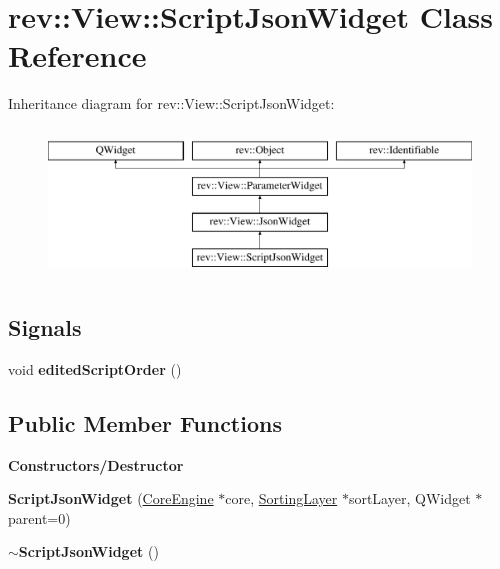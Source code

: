 \hypertarget{classrev_1_1_view_1_1_script_json_widget}{}\section{rev\+::View\+::Script\+Json\+Widget Class Reference}
\label{classrev_1_1_view_1_1_script_json_widget}
Inheritance diagram for rev\+::View\+::Script\+Json\+Widget\+:\begin{figure}[H]
\begin{center}
\leavevmode
\includegraphics[height=4.000000cm]{classrev_1_1_view_1_1_script_json_widget}
\end{center}
\end{figure}
\subsection*{Signals}
\begin{DoxyCompactItemize}
\item 
\mbox{\label{classrev_1_1_view_1_1_script_json_widget_a4afef6118d1e02301ce3736d4b35288d}} 
void {\bfseries edited\+Script\+Order} ()
\end{DoxyCompactItemize}
\subsection*{Public Member Functions}
\begin{Indent}\textbf{ Constructors/\+Destructor}\par
\begin{DoxyCompactItemize}
\item 
\mbox{\label{classrev_1_1_view_1_1_script_json_widget_a7e8080da0621dd178f2eaa48329df524}} 
{\bfseries Script\+Json\+Widget} (\mbox{\hyperlink{classrev_1_1_core_engine}{Core\+Engine}} $\ast$core, \mbox{\hyperlink{structrev_1_1_sorting_layer}{Sorting\+Layer}} $\ast$sort\+Layer, Q\+Widget $\ast$parent=0)
\item 
\mbox{\label{classrev_1_1_view_1_1_script_json_widget_a25522a40d58d1b5d4f8b8eb84ed94abc}} 
{\bfseries $\sim$\+Script\+Json\+Widget} ()
\end{DoxyCompactItemize}
\end{Indent}
